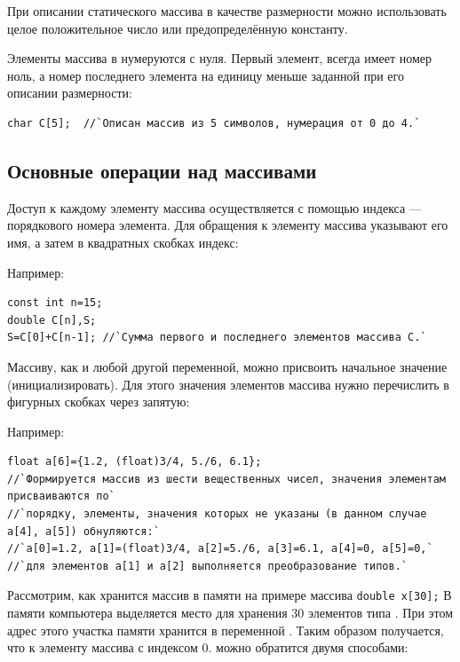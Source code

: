 При описании статического массива в качестве размерности можно использовать целое положительное число или
предопределённую константу.

Элементы массива в  нумеруются с нуля. Первый элемент, всегда имеет номер ноль, а номер последнего элемента на
единицу меньше заданной при его описании размерности: 
\begin{lstlisting}
char C[5];  //`Описан массив из 5 символов, нумерация от 0 до 4.`
\end{lstlisting}

\subsection[Основные операции над массивами]{Основные операции над массивами}
Доступ к каждому элементу массива осуществляется с помощью индекса --- порядкового номера элемента. Для обращения к
элементу массива указывают его имя, а затем в квадратных скобках индекс:


Например:
\begin{lstlisting}
const int n=15; 
double C[n],S;
S=C[0]+C[n-1]; //`Сумма первого и последнего элементов массива С.`
\end{lstlisting}

Массиву, как и любой другой переменной, можно присвоить начальное значение (инициализировать). Для этого значения
элементов массива нужно перечислить в фигурных скобках через запятую:

{\small{}}

Например:
\begin{lstlisting}
float a[6]={1.2, (float)3/4, 5./6, 6.1}; 
//`Формируется массив из шести вещественных чисел, значения элементам присваиваются по`
//`порядку, элементы, значения которых не указаны (в данном случае a[4], a[5]) обнуляются:`
//`a[0]=1.2, a[1]=(float)3/4, a[2]=5./6, a[3]=6.1, a[4]=0, a[5]=0,` 
//`для элементов a[1] и a[2] выполняется преобразование типов.`
\end{lstlisting}

Рассмотрим, как хранится массив в памяти на примере массива
\lstinline!double x[30];! 
В памяти компьютера выделяется место для хранения 30 элементов типа . При этом адрес этого
участка памяти хранится в переменной . Таким образом получается, что к элементу массива с индексом
0. можно обратится двумя способами:


